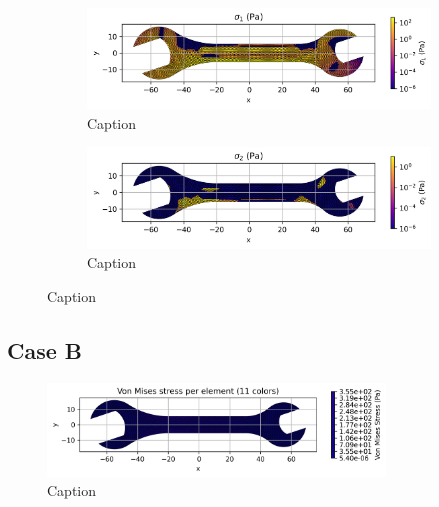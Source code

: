   \begin{figure}[H]
    \centering
    \begin{subfigure}[t]{0.49\textwidth}
      \centering
      \includegraphics[width=\textwidth]{GRAFICOS/Case a - sigma_1_per_element.png}
      \caption{Caption}
      \label{fig:deformada_reacciones}
    \end{subfigure}
    \hfill
    \begin{subfigure}[t]{0.49\textwidth}
      \centering
      \includegraphics[width=\textwidth]{GRAFICOS/Case a - sigma_2_per_element.png}
      \caption{Caption}
      \label{fig:von_mises}
    \end{subfigure}
    \caption{Caption}
    \label{fig:analisis_estructural}
  \end{figure}

\subsection{Case B}

\begin{figure}[H]
    \centering
    \includegraphics[width=0.8\textwidth]{GRAFICOS/Case b_von_mises_per_element_11_colors.png}
    \caption{Caption}
    \label{fig:strain}
  \end{figure}

